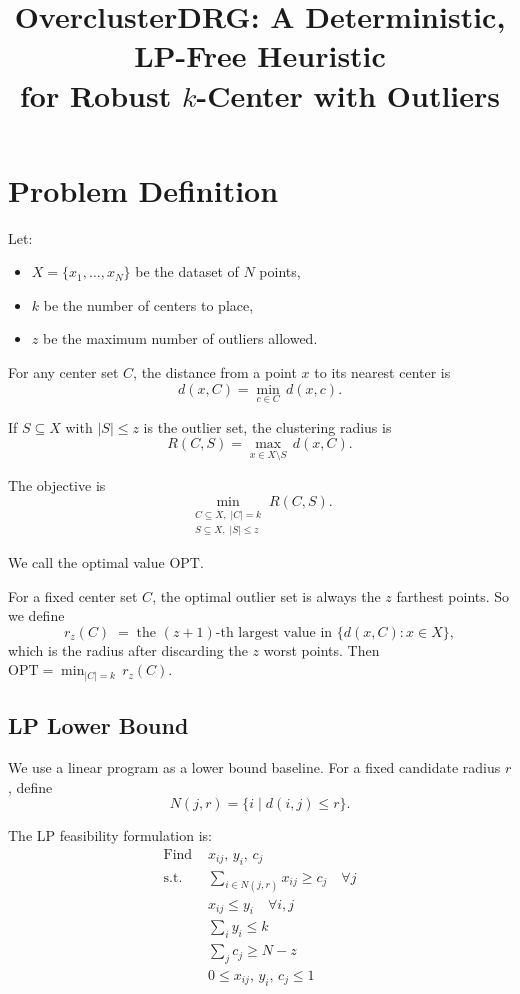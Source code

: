 \documentclass[11pt]{article}
\title{OverclusterDRG: A Deterministic, LP-Free Heuristic\\
for Robust $k$-Center with Outliers}
\author{}
\date{}
\begin{document}
\maketitle

\section{Problem Definition}

Let:
\begin{itemize}
    \item $X = \{x_1, \dots, x_N\}$ be the dataset of $N$ points,
    \item $k$ be the number of centers to place,
    \item $z$ be the maximum number of outliers allowed.
\end{itemize}

For any center set $C$, the distance from a point $x$ to its nearest center is
\[
d(x, C) = \min_{c \in C}\, d(x, c).
\]

If $S \subseteq X$ with $|S| \le z$ is the outlier set, the clustering radius is
\[
R(C, S) = \max_{x \in X \setminus S}\, d(x, C).
\]

The objective is
\[
\min_{\substack{C \subseteq X,\; |C|=k \\ S \subseteq X,\; |S| \le z}} R(C,S).
\]

We call the optimal value $\mathrm{OPT}$.

For a fixed center set $C$, the optimal outlier set is always the $z$ farthest points. So we define
\[
r_z(C) \;=\; \text{the }(z{+}1)\text{-th largest value in } \{d(x,C) : x \in X\},
\]
which is the radius after discarding the $z$ worst points. Then $\mathrm{OPT} = \min_{|C|=k}\, r_z(C)$.

\subsection{LP Lower Bound}

We use a linear program as a lower bound baseline. For a fixed candidate radius $r$, define
\[
N(j, r) = \{ i \mid d(i,j) \le r \}.
\]

The LP feasibility formulation is:
\begin{align*}
\text{Find } & x_{ij},\, y_i,\, c_j \\
\text{s.t.}\quad
& \sum_{i \in N(j,r)} x_{ij} \ge c_j \quad \forall j \\
& x_{ij} \le y_i \quad \forall i,j \\
& \sum_i y_i \le k \\
& \sum_j c_j \ge N - z \\
& 0 \le x_{ij},\, y_i,\, c_j \le 1
\end{align*}
\end{document}
